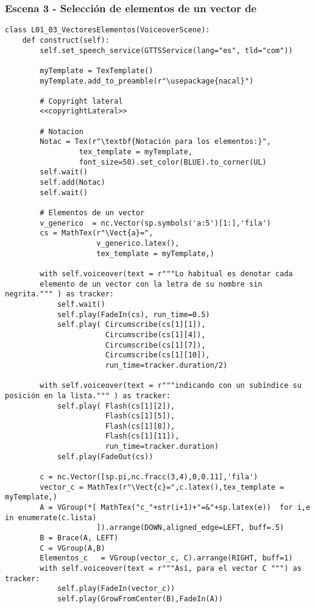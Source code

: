 \documentclass[11pt]{article}
\begin{document}
\begin{verbatim}
\end{verbatim}

\subsubsection{Escena 3 - Selección de elementos de un vector de \R[n]}
\label{sec:org6346092}

\begin{verbatim}
class L01_03_VectoresElementos(VoiceoverScene):
    def construct(self):
        self.set_speech_service(GTTSService(lang="es", tld="com"))
        
        myTemplate = TexTemplate()
        myTemplate.add_to_preamble(r"\usepackage{nacal}")
        
        # Copyright lateral
        <<copyrightLateral>>
        
        # Notacion
        Notac = Tex(r"\textbf{Notación para los elementos:}",
                 tex_template = myTemplate,
                 font_size=50).set_color(BLUE).to_corner(UL)
        self.wait()
        self.add(Notac)
        self.wait()
        
        # Elementos de un vector
        v_generico  = nc.Vector(sp.symbols('a:5')[1:],'fila')
        cs = MathTex(r"\Vect{a}=",
                     v_generico.latex(),
                     tex_template = myTemplate,)
        
        with self.voiceover(text = r"""Lo habitual es denotar cada
        elemento de un vector con la letra de su nombre sin negrita.""" ) as tracker:
            self.wait()
            self.play(FadeIn(cs), run_time=0.5)
            self.play( Circumscribe(cs[1][1]),
                       Circumscribe(cs[1][4]),
                       Circumscribe(cs[1][7]),
                       Circumscribe(cs[1][10]),
                       run_time=tracker.duration/2)
            
        with self.voiceover(text = r"""indicando con un subíndice su posición en la lista.""" ) as tracker:
            self.play( Flash(cs[1][2]),
                       Flash(cs[1][5]),
                       Flash(cs[1][8]),
                       Flash(cs[1][11]),
                       run_time=tracker.duration)
            self.play(FadeOut(cs))
            
        c = nc.Vector([sp.pi,nc.fracc(3,4),0,0.11],'fila')
        vector_c = MathTex(r"\Vect{c}=",c.latex(),tex_template = myTemplate,)
        A = VGroup(*[ MathTex("c_"+str(i+1)+"=&"+sp.latex(e))  for i,e in enumerate(c.lista)
                     ]).arrange(DOWN,aligned_edge=LEFT, buff=.5)
        B = Brace(A, LEFT)
        C = VGroup(A,B)        
        Elementos_c   = VGroup(vector_c, C).arrange(RIGHT, buff=1)
        with self.voiceover(text = r"""Así, para el vector C """) as tracker:
            self.play(FadeIn(vector_c))
            self.play(GrowFromCenter(B),FadeIn(A))
            

\end{verbatim}
\end{document}
